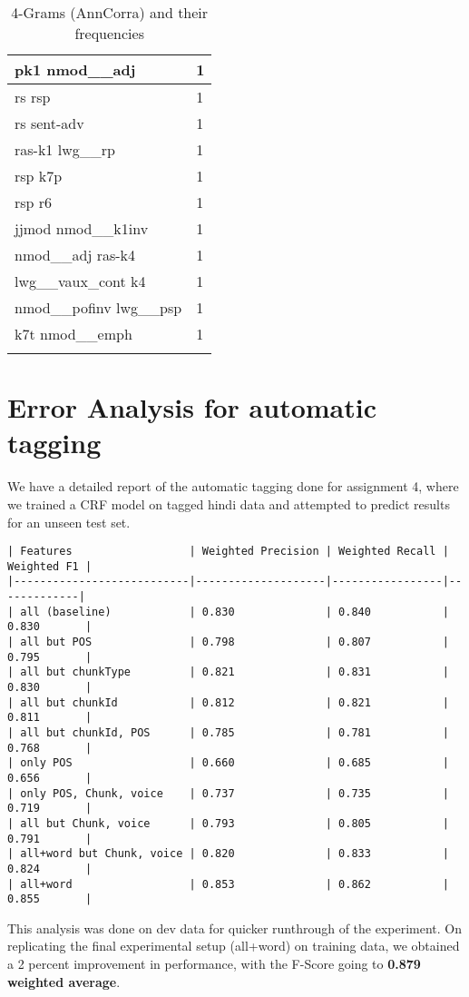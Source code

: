 \documentclass[a4 paper]{article}
\begin{document}
\begin{longtable}{p{}p{}}
pk1 nmod\_\_adj  & 1 \\ \midrule
rs rsp  & 1 \\ \midrule
rs sent-adv  & 1 \\ \midrule
ras-k1 lwg\_\_rp  & 1 \\ \midrule
rsp k7p  & 1 \\ \midrule
rsp r6  & 1 \\ \midrule
jjmod nmod\_\_k1inv  & 1 \\ \midrule
nmod\_\_adj ras-k4  & 1 \\ \midrule
lwg\_\_vaux\_cont k4  & 1 \\ \midrule
nmod\_\_pofinv lwg\_\_psp  & 1 \\ \midrule
k7t nmod\_\_emph  & 1 \\ \midrule
    \caption{4-Grams (AnnCorra) and their frequencies}
\label{tab:ngram4ann}
\end{longtable}
    




\section{Error Analysis for automatic tagging}
We have a detailed report of the automatic tagging done for assignment 4,
where we trained a CRF model on tagged hindi data and attempted to predict 
results for an unseen test set.\\
\begin{verbatim}
| Features                  | Weighted Precision | Weighted Recall | Weighted F1 |
|---------------------------|--------------------|-----------------|-------------|
| all (baseline)            | 0.830              | 0.840           | 0.830       |
| all but POS               | 0.798              | 0.807           | 0.795       |
| all but chunkType         | 0.821              | 0.831           | 0.830       |
| all but chunkId           | 0.812              | 0.821           | 0.811       |
| all but chunkId, POS      | 0.785              | 0.781           | 0.768       |
| only POS                  | 0.660              | 0.685           | 0.656       |
| only POS, Chunk, voice    | 0.737              | 0.735           | 0.719       |
| all but Chunk, voice      | 0.793              | 0.805           | 0.791       |
| all+word but Chunk, voice | 0.820              | 0.833           | 0.824       |
| all+word                  | 0.853              | 0.862           | 0.855       |
\end{verbatim}
This analysis was done on dev data for quicker runthrough of the experiment.
On replicating the final experimental setup (all+word) on training data, we
obtained a 2 percent improvement in performance, with the F-Score going to
\textbf{0.879 weighted average}.\\
\end{document}
